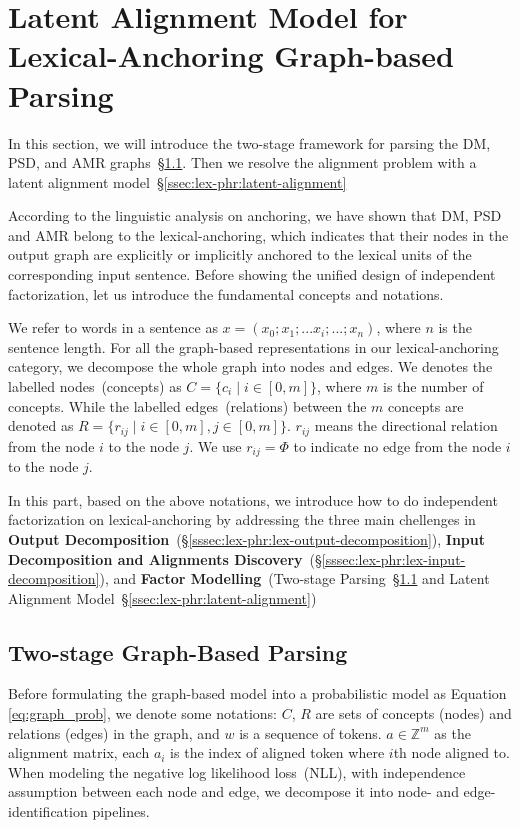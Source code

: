 \section{Latent Alignment Model for Lexical-Anchoring Graph-based Parsing}
\label{sec:lex-phr:graph-based}

In this section, we will introduce the two-stage framework for parsing
the DM, PSD, and AMR graphs~\S\ref{ssec:lex-phr:two-stage}. Then we
resolve the alignment problem with a latent alignment model~\S\ref{ssec:lex-phr:latent-alignment}


According to the linguistic analysis on anchoring, we have shown that
DM, PSD and AMR belong to the lexical-anchoring, which indicates that
their nodes in the output graph are explicitly or implicitly anchored
to the lexical units of the corresponding input sentence.  Before
showing the unified design of independent factorization, let us
introduce the fundamental concepts and notations.

We refer to words in a sentence as
$x=(x_{0};x_{1};...x_{i};...;x_{n})$, where $n$ is the sentence
length.  For all the graph-based representations in our
lexical-anchoring category, we decompose the whole graph into nodes
and edges. We denotes the labelled nodes~(concepts) as
$C = \{c_{i}\mid i \in [0,m]\}$, where $m$ is the number of concepts.
While the labelled edges~(relations) between the $m$ concepts are
denoted as $R = \{r_{ij}\mid i \in [0, m], j \in [0, m]\}$.  $r_{ij}$ means
the directional relation from the node $i$ to the node $j$.  We use
$r_{ij}=\Phi$ to indicate no edge from the node $i$ to the node $j$.

In this part, based on the above notations, we introduce how to do
independent factorization on lexical-anchoring by addressing the three
main chellenges in \textbf{Output
  Decomposition}~(\S\ref{sssec:lex-phr:lex-output-decomposition}),
\textbf{Input Decomposition and Alignments
  Discovery}~(\S\ref{sssec:lex-phr:lex-input-decomposition}), and
\textbf{Factor Modelling}~(Two-stage
Parsing~\S\ref{ssec:lex-phr:two-stage} and Latent Alignment
Model~\S\ref{ssec:lex-phr:latent-alignment})



\subsection{Two-stage Graph-Based Parsing}
\label{ssec:lex-phr:two-stage}

Before formulating the graph-based model into a probabilistic model as
Equation \ref{eq:graph_prob}, we denote some notations: $C$, $R$ are
sets of concepts (nodes) and relations (edges) in the graph, and $w$
is a sequence of tokens.  $a \in {\mathbb{Z}}^m$ as the alignment
matrix, each $a_{i}$ is the index of aligned token where $i$th node
aligned to. When modeling the negative log likelihood loss~(NLL), with
independence assumption between each node and edge, we decompose it
into node- and edge-identification pipelines.

